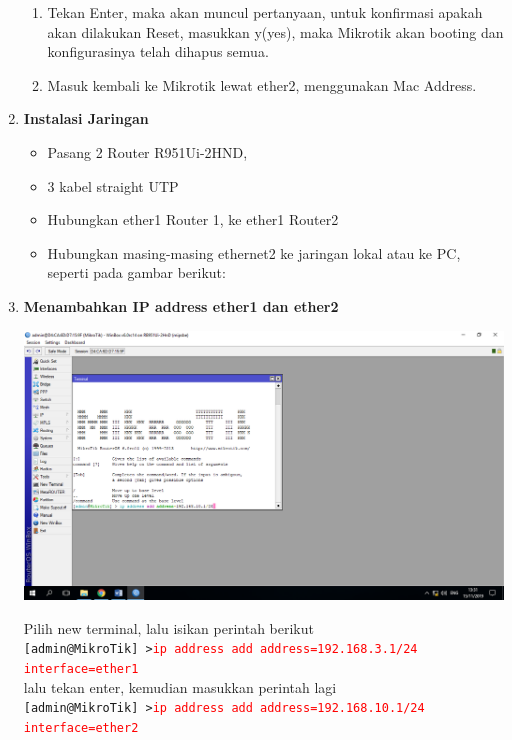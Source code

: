 \documentclass[a4paper,12pt]{article}
\begin{document}
\begin{enumerate}
\begin{enumerate}[label=\alph*.]
		\item Tekan Enter, maka akan muncul pertanyaan, untuk konfirmasi apakah akan dilakukan Reset, masukkan y(yes), maka Mikrotik akan booting dan konfigurasinya telah dihapus semua.
		
		\item Masuk kembali ke Mikrotik lewat ether2, menggunakan Mac Address.
		
	\end{enumerate}
	
	\item {\bfseries Instalasi Jaringan\\}
	\begin{itemize}
		\item Pasang 2 Router R951Ui-2HND,
		
		\item 3 kabel  straight UTP
		
		\item Hubungkan ether1 Router 1, ke ether1 Router2
		
		\item Hubungkan masing-masing ethernet2 ke jaringan lokal atau ke PC, seperti pada gambar berikut:
		
	\end{itemize}

	\item \textbf{Menambahkan IP address ether1 dan ether2}
	\begin{center}
		\includegraphics[scale=.4]{Page-2-Image-3}	
	\end{center}
	Pilih new terminal, lalu isikan perintah berikut\\
	\texttt{[admin@MikroTik] >\textcolor{red} {ip address add address=192.168.3.1/24 interface=ether1}}\\
	lalu tekan enter, kemudian masukkan perintah lagi\\
	\texttt{[admin@MikroTik] >\textcolor{red} {ip address add address=192.168.10.1/24 interface=ether2}}\\
	

\end{enumerate}
\end{document}
